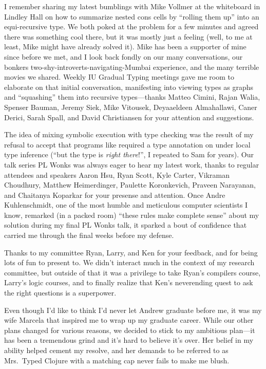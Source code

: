 I remember sharing my latest bumblings with Mike Vollmer at the whiteboard in Lindley Hall
on how to summarize nested cons cells by ``rolling them up'' into an equi-recursive type.
We both poked at the problem for a few minutes and agreed there was something cool there,
but it was mostly just a feeling (well, to me at least, Mike might have already solved it).
Mike has been a supporter of mine since before we met, and I look back fondly on our
many conversations, our bonkers two-shy-introverts-navigating-Mumbai experience,
and the many terrible movies we shared.
Weekly IU Gradual Typing meetings
gave me room to elaborate on that initial conversation, manifesting into
viewing types as graphs and ``squashing'' them into recursive types---thanks
Matteo Cimini, Rajan Walia, Spenser Bauman, Jeremy Siek, Mike Vitousek, Deyaaeldeen Almahallawi,
Caner Derici, Sarah Spall, and David Christiansen
for your attention and suggestions.

The idea of mixing symbolic execution with type checking was the result of my refusal
to accept that programs like  required a type annotation
on  under local type inference
(``but the type is \emph{right there}!'', I repeated to Sam for years).
Our talk series PL Wonks was always eager to hear my latest work,
thanks to regular attendees and speakers Aaron Hsu, Ryan Scott, Kyle Carter, 
Vikraman Choudhury, Matthew Heimerdinger, Paulette Koronkevich, Praveen Narayanan,
and
Chaitanya Koparkar for your presense and attention.
Once Andre Kuhlenschmidt, one of the most humble and meticulous computer scientists
I know, remarked (in a packed room) ``these rules make complete sense'' 
about my solution during my final PL Wonks talk,
it sparked a bout of confidence that carried
me through the final weeks before my defense.

Thanks to my committee Ryan, Larry, and Ken for your feedback, and for being
lots of fun to present to.
We didn't interact much in the context of my research committee, but outside of that
it was a privilege to take Ryan's compilers course, Larry's logic courses,
and to finally realize that Ken's neverending quest to ask the right questions
is a superpower.

Even though I'd like to think I'd never let Andrew graduate before me,
it was my wife Marcela that inspired me to wrap up my graduate career.
While our other plans changed for various reasons, we decided to stick to
my ambitious plan---it has been a tremendous grind and it's hard to believe
it's over.  Her belief in my ability helped cement my resolve, and her demands
to be referred to as Mrs.~Typed Clojure with a matching cap never
fails to make me blush.
